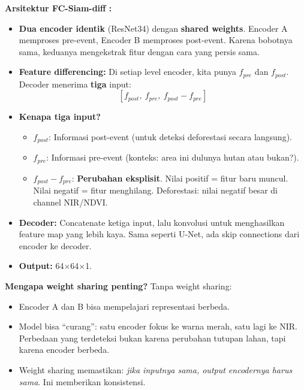 \documentclass[10pt,a4paper,onecolumn]{article}
\begin{document}
\textbf{Arsitektur FC-Siam-diff \cite{daudt2018fcsiam}:}

\begin{itemize}[nosep]
    \item \textbf{Dua encoder identik} (ResNet34) dengan \textbf{shared
          weights}. Encoder A memproses pre-event, Encoder B memproses
          post-event. Karena bobotnya sama, keduanya mengekstrak
          fitur dengan cara yang persis sama.
    \item \textbf{Feature differencing:} Di setiap level encoder,
          kita punya $f_{pre}$ dan $f_{post}$. Decoder menerima
          \textbf{tiga} input:
          $$[f_{post},\ f_{pre},\ f_{post} - f_{pre}]$$
    \item \textbf{Kenapa tiga input?}
    \begin{itemize}[nosep]
        \item $f_{post}$: Informasi post-event (untuk deteksi
              deforestasi secara langsung).
        \item $f_{pre}$: Informasi pre-event (konteks: area ini
              dulunya hutan atau bukan?).
        \item $f_{post} - f_{pre}$: \textbf{Perubahan eksplisit}.
              Nilai positif = fitur baru muncul. Nilai negatif =
              fitur menghilang. Deforestasi: nilai negatif besar
              di channel NIR/NDVI.
    \end{itemize}
    \item \textbf{Decoder:} Concatenate ketiga input, lalu konvolusi
          untuk menghasilkan feature map yang lebih kaya. Sama seperti
          U-Net, ada skip connections dari encoder ke decoder.
    \item \textbf{Output:} 64$\times$64$\times$1.
\end{itemize}

\textbf{Mengapa weight sharing penting?} Tanpa weight sharing:
\begin{itemize}[nosep]
    \item Encoder A dan B bisa mempelajari representasi berbeda.
    \item Model bisa ``curang'': satu encoder fokus ke warna merah,
          satu lagi ke NIR. Perbedaan yang terdeteksi bukan karena
          perubahan tutupan lahan, tapi karena encoder berbeda.
    \item Weight sharing memastikan: \textit{jika inputnya sama,
          output encodernya harus sama}. Ini memberikan konsistensi.
\end{itemize}
\end{document}
